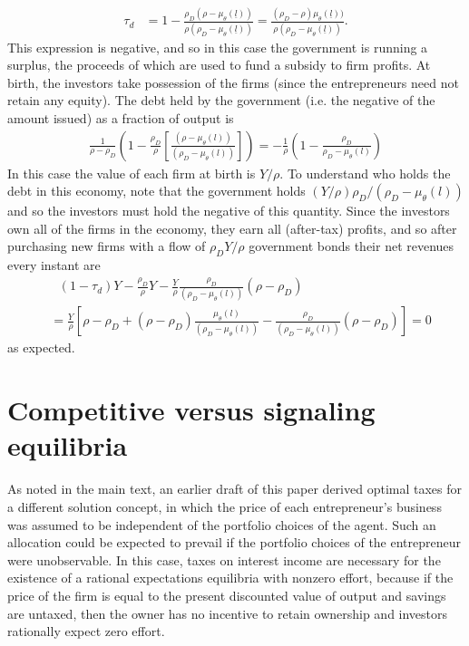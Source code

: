 \documentclass[11pt]{article}
\theoremstyle{plain}
\begin{document}
\begin{align*}
\tau_d & = 1 - \frac{\rho_D(\rho - \mu_{\theta}(\underline{l}))}{\rho(\rho_D - \mu_{\theta}(\underline{l}))}
 = \frac{(\rho_D - \rho)\mu_{\theta}(\underline{l}))}{\rho(\rho_D - \mu_{\theta}(\underline{l}))}.
\end{align*}
This expression is negative, and so in this case the government is running a surplus, the proceeds of which are used to fund a subsidy to firm profits. At birth, the investors take possession of the firms (since the entrepreneurs need not retain any equity). The debt held by the government (i.e. the negative of the amount issued) as a fraction of output is
\begin{align*}
\frac{1}{\rho-\rho_D}{\left(1 - \frac{\rho_D}{\rho}{\left[\frac{(\rho - \mu_{\theta}(l))}{(\rho_D - \mu_{\theta}(l))}  \right]}\right)} = -\frac{1}{\rho}{\left(1 - \frac{\rho_D}{\rho_D - \mu_{\theta}(l)}\right)}
\end{align*} %
In this case the value of each firm at birth is $Y/\rho$. To understand who holds the debt in this economy, note that the government holds $(Y/\rho)\rho_D/(\rho_D - \mu_{\theta}(l))$ and so the investors must hold the negative of this quantity. Since the investors own all of the firms in the economy, they earn all (after-tax) profits, and so after purchasing new firms with a flow of $\rho_DY/\rho$ government bonds their net revenues every instant are 
\begin{align*}
& \ \ \ (1-\tau_d)Y - \frac{\rho_D}{\rho}Y - \frac{Y}{\rho}\frac{\rho_D}{(\rho_D - \mu_{\theta}(l))}(\rho - \rho_D)
\\ & = \frac{Y}{\rho}{\left[\rho - \rho_D + (\rho - \rho_D) \frac{\mu_{\theta}(l)}{(\rho_D - \mu_{\theta}(l))} - \frac{\rho_D}{(\rho_D - \mu_{\theta}(l))}(\rho - \rho_D)\right]} = 0
\end{align*}
as expected.


\section{Competitive versus signaling equilibria} \label{eqcompare}

As noted in the main text, an earlier draft of this paper derived optimal taxes for a different solution concept, in which the price of each entrepreneur's business was assumed to be independent of the portfolio choices of the agent. Such an allocation could be expected to prevail if the portfolio choices of the entrepreneur were unobservable. In this case, taxes on interest income are necessary for the existence of a rational expectations equilibria with nonzero effort, because if the price of the firm is equal to the present discounted value of output and savings are untaxed, then the owner has no incentive to retain ownership and investors rationally expect zero effort.
\end{document}
